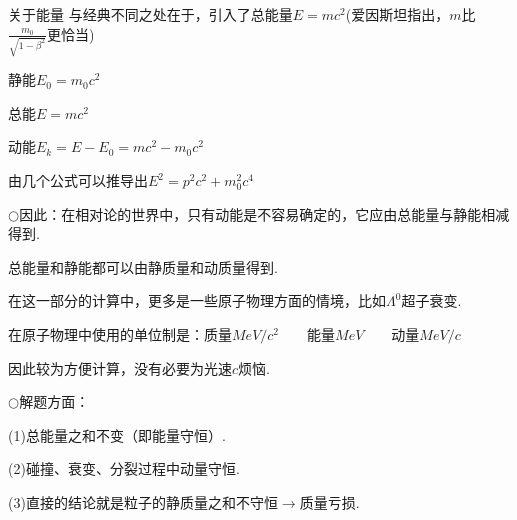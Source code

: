 \documentclass[a4paper, opensource]{./template/qyxf-book}
\begin{document}
\begin{section}{关于能量}
与经典不同之处在于，引入了总能量$E=mc^2$(爱因斯坦指出，$m$比$\frac{m_0}{\sqrt{1-\beta^2}}$更恰当)

静能\qquad$E_0=m_0c^2$

总能\qquad$E=mc^2$

动能\qquad$E_k=E-E_0=mc^2-m_0c^2$

由几个公式可以推导出$E^2=p^2c^2+m_0^2c^4$

$\bigcirc$因此：在相对论的世界中，只有动能是不容易确定的，它应由总能量与静能相减得到.

总能量和静能都可以由静质量和动质量得到.

在这一部分的计算中，更多是一些原子物理方面的情境，比如$\Lambda^0$超子衰变.

在原子物理中使用的单位制是：质量$MeV/c^2\hspace{2em}$能量$MeV\hspace{2em}$动量$MeV/c$

因此较为方便计算，没有必要为光速$c$烦恼.

$\bigcirc$解题方面：

(1)总能量之和不变（即能量守恒）.

(2)碰撞、衰变、分裂过程中动量守恒.

(3)直接的结论就是粒子的静质量之和不守恒$\rightarrow$质量亏损.
\end{section}
\end{document}
